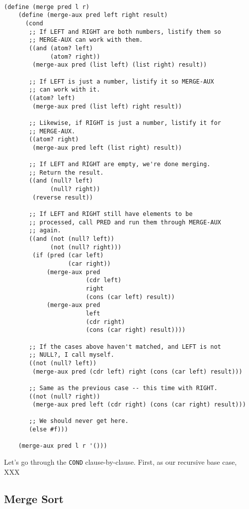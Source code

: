 \documentclass[12pt,openright,draft]{book}
\begin{document}
\begin{verbatim}

(define (merge pred l r)
    (define (merge-aux pred left right result)
      (cond
       ;; If LEFT and RIGHT are both numbers, listify them so
       ;; MERGE-AUX can work with them.
       ((and (atom? left)
             (atom? right))
        (merge-aux pred (list left) (list right) result))

       ;; If LEFT is just a number, listify it so MERGE-AUX
       ;; can work with it.
       ((atom? left)
        (merge-aux pred (list left) right result))

       ;; Likewise, if RIGHT is just a number, listify it for
       ;; MERGE-AUX.
       ((atom? right)
        (merge-aux pred left (list right) result))

       ;; If LEFT and RIGHT are empty, we're done merging.
       ;; Return the result.
       ((and (null? left)
             (null? right))
        (reverse result))

       ;; If LEFT and RIGHT still have elements to be
       ;; processed, call PRED and run them through MERGE-AUX
       ;; again.
       ((and (not (null? left))
             (not (null? right)))
        (if (pred (car left)
                  (car right))
            (merge-aux pred
                       (cdr left)
                       right
                       (cons (car left) result))
            (merge-aux pred
                       left
                       (cdr right)
                       (cons (car right) result))))

       ;; If the cases above haven't matched, and LEFT is not
       ;; NULL?, I call myself.
       ((not (null? left))
        (merge-aux pred (cdr left) right (cons (car left) result)))

       ;; Same as the previous case -- this time with RIGHT.
       ((not (null? right))
        (merge-aux pred left (cdr right) (cons (car right) result)))

       ;; We should never get here.
       (else #f)))

    (merge-aux pred l r '()))

\end{verbatim}

Let's go through the \verb|COND| clause-by-clause.  First, as our recursive
base case, XXX

\subsection{Merge Sort}
\end{document}
